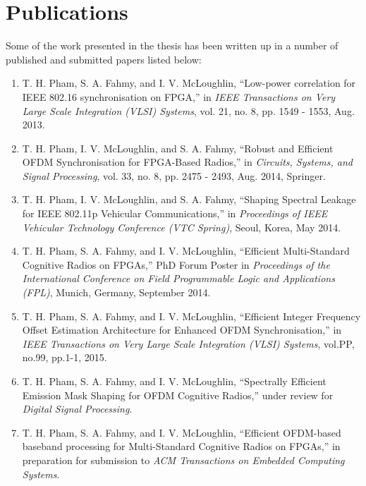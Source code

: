 \section{Publications}
Some of the work presented in the thesis has been written up in a number of published and submitted papers listed below:

\begin{enumerate}

\item  T. H. Pham, S. A. Fahmy, and I. V. McLoughlin, ``Low-power correlation for IEEE 802.16 synchronisation on FPGA,'' in \textit{IEEE Transactions on Very Large Scale Integration (VLSI) Systems}, vol. 21, no. 8, pp. 1549 - 1553, Aug. 2013.

\item T. H. Pham, I. V. McLoughlin, and S. A. Fahmy, ``Robust and Efficient OFDM Synchronisation for FPGA-Based Radios,'' in \textit{Circuits, Systems, and Signal Processing}, vol. 33, no. 8, pp. 2475 - 2493, Aug. 2014, Springer.

\item  T. H. Pham, I. V. McLoughlin, and S. A. Fahmy, ``Shaping Spectral Leakage for IEEE 802.11p Vehicular Communications,'' in \textit{Proceedings of IEEE Vehicular Technology Conference (VTC Spring)}, Seoul, Korea, May 2014.

\item T. H. Pham, S. A. Fahmy, and I. V. McLoughlin, ``Efficient Multi-Standard Cognitive Radios on FPGAs,'' PhD Forum Poster in \textit{Proceedings of the International Conference on Field Programmable Logic and Applications (FPL)}, Munich, Germany, September 2014.

\item T. H. Pham, S. A. Fahmy, and I. V. McLoughlin, ``Efficient Integer Frequency Offset Estimation Architecture for Enhanced OFDM Synchronisation,'' in \textit{IEEE Transactions on Very Large Scale Integration (VLSI) Systems}, vol.PP, no.99, pp.1-1, 2015.

\item T. H. Pham, S. A. Fahmy, and I. V. McLoughlin, ``Spectrally Efficient Emission Mask Shaping for OFDM Cognitive Radios,'' under review for \textit{Digital Signal Processing}.

\item T. H. Pham, S. A. Fahmy, and I. V. McLoughlin, ``Efficient OFDM-based baseband processing for Multi-Standard Cognitive Radios on FPGAs,'' in preparation for submission to \emph{ACM Transactions on Embedded Computing Systems}.

\end{enumerate}
